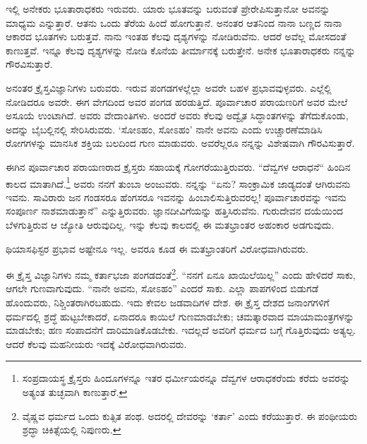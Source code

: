 \vspace{0.13cm}

ಇಲ್ಲಿ ಅನೇಕರು ಭೂತಾರಾಧಕರು ಇರುವರು. ಯಾರು ಭೂತವನ್ನು ಬರುವಂತೆ ಪ್ರೇರೇಪಿಸುತ್ತಾನೋ ಅವನನ್ನು ಮಾಧ್ಯಮ ಎನ್ನುತ್ತಾರೆ. ಆತನು ಒಂದು ತೆರೆಯ ಹಿಂದೆ ಹೋಗುತ್ತಾನೆ. ಅನಂತರ ಆತನಿಂದ ನಾನಾ ಬಣ್ಣದ ನಾನಾ ಆಕಾರದ ಭೂತಗಳು ಬರುತ್ತವೆ. ನಾನು ಇಂತಹ ಕೆಲವು ದೃಶ್ಯಗಳನ್ನು ನೋಡಿರುವೆನು. ಆದರೆ ಅವೆಲ್ಲ ಮೋಸದಂತೆ ಕಾಣುತ್ತವೆ. ಇನ್ನೂ ಕೆಲವು ದೃಶ್ಯಗಳನ್ನು ನೋಡಿ ಕೊನೆಯ ತೀರ್ಮಾನಕ್ಕೆ ಬರುತ್ತೇನೆ. ಅನೇಕ ಭೂತಾರಾಧಕರು ನನ್ನನ್ನು ಗೌರವಿಸುತ್ತಾರೆ.

\vspace{0.13cm}

ಅನಂತರ ಕ್ರೈಸ್ತವಿಜ್ಞಾನಿಗಳು ಬರುವರು. ಇರುವ ಪಂಗಡಗಳಲ್ಲೆಲ್ಲಾ ಅವರೇ ಬಹಳ ಪ್ರಭಾವವುಳ್ಳವರು. ಎಲ್ಲೆಲ್ಲಿ ನೋಡಿದರೂ ಅವರೇ. ಈಗ ವೇಗದಿಂದ ಅವರ ಪಂಗಡ ಹರಡುತ್ತಿದೆ. ಪೂರ್ವಾಚಾರ ಪರಾಯಣರಿಗೆ ಅವರ ಮೇಲೆ ಅಸೂಯೆ ಉಂಟಾಗಿದೆ. ಅವರು ವೇದಾಂತಿಗಳು. ಅಂದರೆ ಅವರು ಕೆಲವು ಅದ್ವೈತ ಸಿದ್ಧಾಂತಗಳನ್ನು ತೆಗೆದುಕೊಂಡು, ಅದನ್ನು ಬೈಬಲ್ಲಿನಲ್ಲಿ ಸೇರಿಸಿರುವರು. ‘ಸೋಽಹಂ, ಸೋಽಹಂ’ \enginline{-} ನಾನೇ ಅವನು \enginline{-} ಎಂದು ಉಚ್ಚಾರಣೆಮಾಡಿಸಿ ರೋಗಗಳನ್ನು ಮಾನಸಿಕ ಶಕ್ತಿಯ ಬಲದಿಂದ ಗುಣ ಮಾಡುವರು. ಅವರೆಲ್ಲರೂ ನನ್ನನ್ನು ವಿಶೇಷವಾಗಿ ಗೌರವಿಸುತ್ತಾರೆ.

\vspace{0.13cm}

ಈಗಿನ ಪೂರ್ವಾಚಾರ ಪರಾಯಣರಾದ ಕ್ರೈಸ್ತರು ಸಹಾಯಕ್ಕೆ ಗೋಗರೆಯುತ್ತಿರುವರು. “ದೆವ್ವಗಳ ಆರಾಧನೆ“ ಹಿಂದಿನ ಕಾಲದ ಮಾತಾಗಿದೆ.\footnote{ಸಂಪ್ರದಾಯಸ್ಥ ಕ್ರೈಸ್ತರು ಹಿಂದೂಗಳನ್ನೂ ಇತರ ಧರ್ಮೀಯರನ್ನೂ ದೆವ್ವಗಳ ಆರಾಧಕರೆಂದು ಕರೆದು ಅವರನ್ನು ಅತ್ಯಂತ ತುಚ್ಛವಾಗಿ ಕಾಣುತ್ತಾರೆ.} ಅವರು ನನಗೆ ತುಂಬಾ ಅಂಜುವರು. ನನ್ನನ್ನು “ಏನು? ಸಾಂಕ್ರಾಮಿಕ ಜಾಡ್ಯದಂತೆ ಆಗಿರುವನು ಇವನು. ಸಾವಿರಾರು ಜನ ಗಂಡಸರೂ ಹೆಂಗಸರೂ ಇವನನ್ನು ಹಿಂಬಾಲಿಸುತ್ತಿರುವರಲ್ಲ! ಪೂರ್ವಾಚಾರವನ್ನು ಇವನು ಸಂಪೂರ್ಣ ನಾಶಮಾಡುತ್ತಾನೆ” ಎನ್ನುತ್ತಿರುವರು. ಜ್ಞಾನದೀವಿಗೆಯನ್ನು ಹತ್ತಿಸಿರುವೆನು. ಗುರುದೇವನ ದಯೆಯಿಂದ ಬೆಳಗುತ್ತಿರುವ ಆ ಜ್ಯೋತಿ ಆರುವುದಿಲ್ಲ. ಇನ್ನು 
ಕೆಲವು ಕಾಲದಲ್ಲಿ ಈ ಮತಭ್ರಾಂತರ ಅಹಂಕಾರ ಅಡಗುವುದು.

\vspace{0.13cm}

ಥಿಯಾಸಫಿಸ್ಟರ ಪ್ರಭಾವ ಅಷ್ಟೇನೂ ಇಲ್ಲ. ಅವರೂ ಕೂಡ ಈ ಮತಭ್ರಾಂತರಿಗೆ ವಿರೋಧವಾಗಿರುವರು.

\newpage

ಈ ಕ್ರೈಸ್ತ ವಿಜ್ಞಾನಿಗಳು ನಮ್ಮ ಕರ್ತಾಭಜಾ ಪಂಗಡದಂತೆ\footnote{ವೈಷ್ಣವ ಧರ್ಮದ ಒಂದು ಕುತ್ಸಿತ ಪಂಥ. ಅದರಲ್ಲಿ ದೇವರನ್ನು ‘ಕರ್ತಾ’ ಎಂದು ಕರೆಯುತ್ತಾರೆ. ಈ ಪಂಥೀಯರು ಶ್ರದ್ಧಾ \enginline{-} ಚಿಕಿತ್ಸೆಯಲ್ಲಿ ನಿಪುಣರು.}. “ನನಗೆ ಏನೂ ಖಾಯಿಲೆಯಿಲ್ಲ” ಎಂದು ಹೇಳಿದರೆ ಸಾಕು, ಆಗಲೇ ಗುಣವಾಗುವುದು. “ನಾನೇ ಅವನು, ಸೋಽಹಂ” ಎಂದರೆ ಸಾಕು. ಎಲ್ಲಾ ಪಾಪಗಳಿಂದ ಬಿಡುಗಡೆ ಹೊಂದುವರು, ನಿಶ್ಚಿಂತರಾಗಿರಬಹುದು. ಇದು ಕೇವಲ ಜಡವಾದಿಗಳ ದೇಶ. ಈ ಕ್ರೈಸ್ತ ದೇಶದ ಜನಾಂಗಗಳಿಗೆ ಧರ್ಮದಲ್ಲಿ ಶ್ರದ್ಧೆ ಹುಟ್ಟಬೇಕಾದರೆ, ಏನಾದರೂ ಕಾಯಿಲೆ ಗುಣಮಾಡಬೇಕು; ಚಮತ್ಕಾರವಾದ ಮಾಯಾಮಂತ್ರಗಳನ್ನು ಮಾಡಬೇಕು; ಹಣ ಸಂಪಾದನೆಗೆ ದಾರಿಮಾಡಿಕೊಡಬೇಕು. ಇದಲ್ಲದೆ ಅವರಿಗೆ ಧರ್ಮದ ಬಗ್ಗೆ ಗೊತ್ತಿರುವುದು ಅತ್ಯಲ್ಪ. ಆದರೆ ಕೆಲವು ಮಹನೀಯರು ಇದಕ್ಕೆ ವಿರೋಧವಾಗಿರುವರು.

